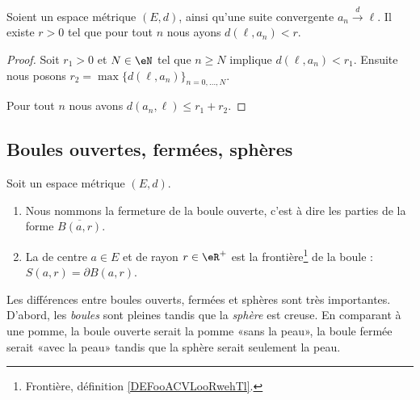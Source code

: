 \begin{proposition}      \label{PROPooUXDJooCrWBbd}
    Soient un espace métrique \( (E,d)\), ainsi qu'une suite convergente \( a_n\stackrel{d}{\longrightarrow}\ell\). Il existe \( r>0\) tel que pour tout \( n\) nous ayons \( d(\ell, a_n)<r\).
\end{proposition}

\begin{proof}
    Soit \( r_1>0\) et \( N\in \eN\) tel que \( n\geq N\) implique \( d(\ell,a_n)<r_1\). Ensuite nous posons \( r_2=\max\{ d(\ell,a_n) \}_{n=0,\ldots, N}\).

    Pour tout \( n\) nous avons \( d(a_n,\ell)\leq r_1+r_2\).
\end{proof}

\subsection{Boules ouvertes, fermées, sphères}

\begin{definition}      \label{DEFooPDSJooFcUqKH}
    Soit un espace métrique \( (E,d)\).
    \begin{enumerate}
        \item
            Nous nommons  la fermeture de la boule ouverte, c'est à dire les parties de la forme \( \overline{ B(a,r) }\).
        \item
            La  de centre \( a\in E\) et de rayon \( r\in \eR^+\) est la frontière\footnote{Frontière, définition \ref{DEFooACVLooRwehTl}.} de la boule : \( S(a,r)=\partial B(a,r)\).
    \end{enumerate}
\end{definition}

\begin{normaltext}
    Les différences entre boules ouverts, fermées et sphères sont très importantes. D'abord, les \emph{boules} sont pleines tandis que la \emph{sphère} est creuse. En comparant à une pomme, la boule ouverte serait la pomme «sans la peau», la boule fermée serait «avec la peau» tandis que la sphère serait seulement la peau. 
\end{normaltext}

